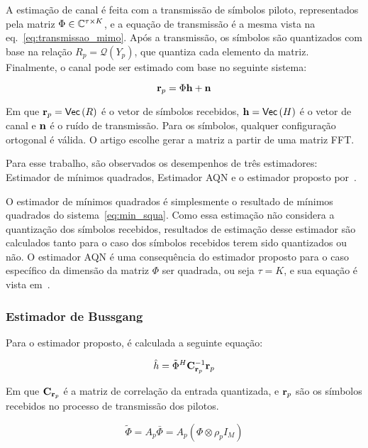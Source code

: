 \documentclass{article}
\begin{document}
A estimação de canal é feita com a transmissão de símbolos piloto, representados pela matriz $\Phi\in\mathbb{C}^{\tau\times K}$, e a equação de transmissão é a mesma vista na eq.~\eqref{eq:transmissao_mimo}. Após a transmissão, os símbolos são quantizados com base na relação $R_p=\mathcal{Q}(Y_p)$, que quantiza cada elemento da matriz. Finalmente, o canal pode ser estimado com base no seguinte sistema:

\begin{equation}
    \label{eq:min_squa}
    \mathbf{r}_p = \Phi\mathbf{h} + \mathbf{n}
\end{equation}

Em que $\mathbf{r}_p= \mathsf{Vec} \left( R \right) $ é o vetor de símbolos recebidos, $\mathbf{h}= \mathsf{Vec} \left( H \right) $ é o vetor de canal e $\mathbf{n}$ é o ruído de transmissão. Para os símbolos, qualquer configuração ortogonal é válida. O artigo escolhe gerar a matriz a partir de uma matriz FFT.  

Para esse trabalho, são observados os desempenhos de três estimadores: Estimador de mínimos quadrados, Estimador AQN e o estimador proposto por~\cite{li.etal_2017a}. 

O estimador de mínimos quadrados é simplesmente o resultado de mínimos quadrados do sistema~\eqref{eq:min_squa}. Como essa estimação não considera a quantização dos símbolos recebidos, resultados de estimação desse estimador são calculados tanto para o caso dos símbolos recebidos terem sido quantizados ou não. O estimador AQN é uma consequência do estimador proposto para o caso específico da dimensão da matriz $\Phi$ ser quadrada, ou seja $\tau=K$, e sua equação é vista em~\cite[eq. 16]{li.etal_2017a}.

\subsubsection{Estimador de Bussgang}

Para o estimador proposto, é calculada a seguinte equação:

\begin{equation}
    \hat{h} = \tilde{\Phi}^H\mathbf{C}_{\mathbf{r}_p}^{-1}\mathbf{r}_p       
    \label{eq:estimador_proposto}
\end{equation}

Em que $\mathbf{C}_{\mathbf{r}_p}$ é a matriz de correlação da entrada quantizada, e $\mathbf{r}_p$ são os símbolos recebidos no processo de transmissão dos pilotos.

\begin{equation}
    \tilde{\Phi}=A_p\bar{\Phi}=A_p(\Phi\otimes\rho_pI_M)
\end{equation}
\end{document}
